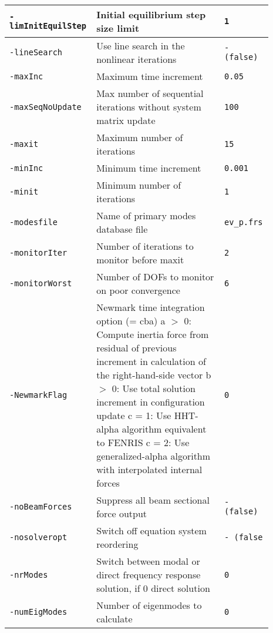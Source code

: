 {\begin{tabular}{|>{\raggedright} p{0.23\linewidth}| p{0.48\linewidth}| p{0.18\linewidth}|}
  \hline
  \texttt{-limInitEquilStep}  &     Initial equilibrium step size limit   &  \texttt{1}  \\
  \hline
  \texttt{-lineSearch}  &     Use line search in the nonlinear iterations   &    \texttt{- (false)}  \\
  \hline
  \texttt{-maxInc}  &     Maximum time increment   &  \texttt{0.05}  \\
  \hline
  \texttt{-maxSeqNoUpdate}  &     Max number of sequential iterations without
                                  system matrix update   &   \texttt{100}  \\
  \hline
  \texttt{-maxit}  &     Maximum number of iterations   &  \texttt{15}  \\
  \hline
  \texttt{-minInc}  &     Minimum time increment  &   \texttt{0.001}  \\
  \hline
  \texttt{-minit}  &     Minimum number of iterations   &  \texttt{1}  \\
  \hline
  \texttt{-modesfile}  &     Name of primary modes database file  &   \texttt{ev\_p.frs}  \\
  \hline
  \texttt{-monitorIter}  &     Number of iterations to monitor before maxit   &   \texttt{2}  \\
  \hline
  \texttt{-monitorWorst}  &     Number of DOFs to monitor on poor convergence   &  \texttt{6}  \\
  \hline
  \texttt{-NewmarkFlag}  &     Newmark time integration option (= cba)\newline
                               a $>$ 0: Compute inertia force from residual
                               of previous increment in calculation of the
                               right-hand-side vector\newline
                               b $>$ 0: Use total solution increment in configuration
                               update\newline
                               c = 1: Use HHT-alpha algorithm equivalent
                               to FENRIS\newline
                               c = 2: Use generalized-alpha algorithm\newline
                               with interpolated internal forces        &   \texttt{0}  \\
  \hline
  \texttt{-noBeamForces}  &     Suppress all beam sectional force output    &    \texttt{- (false)}  \\
  \hline
  \texttt{-nosolveropt}  &     Switch off equation system reordering    &    \texttt{- (false}  \\
  \hline
  \texttt{-nrModes}  &     Switch between modal or direct frequency
                           response solution, if 0 direct solution    &   \texttt{0}  \\
  \hline
  \texttt{-numEigModes}  &     Number of eigenmodes to calculate   &   \texttt{0}  \\
  \hline
\end{tabular}}

